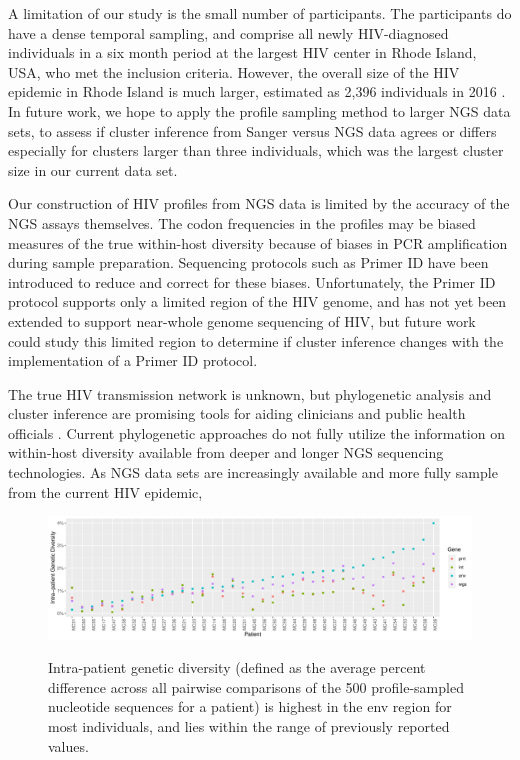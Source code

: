 \documentclass[letterpaper]{article}
\begin{document}
A limitation of our study is the small number of participants. The participants do have a dense temporal sampling, and comprise all newly HIV-diagnosed individuals in a six month period at the largest HIV center in Rhode Island, USA, who met the inclusion criteria. However, the overall size of the HIV epidemic in Rhode Island is much larger, estimated as 2,396 individuals in 2016 \parencite{ridoh}. In future work, we hope to apply the profile sampling method to larger NGS data sets, to assess if cluster inference from Sanger versus NGS data agrees or differs especially for clusters larger than three individuals, which was the largest cluster size in our current data set.

Our construction of HIV profiles from NGS data is limited by the accuracy of the NGS assays themselves. The codon frequencies in the profiles may be biased measures of the true within-host diversity because of biases in PCR amplification during sample preparation. Sequencing protocols such as Primer ID \cite{jabara} have been introduced to reduce and correct for these biases. Unfortunately, the Primer ID protocol supports only a limited region of the HIV genome, and has not yet been extended to support near-whole genome sequencing of HIV, but future work could study this limited region to determine if cluster inference changes with the implementation of a Primer ID protocol.

The true HIV transmission network is unknown, but phylogenetic analysis and cluster inference are promising tools for aiding clinicians and public health officials \cite{fauci}. Current phylogenetic approaches do not fully utilize the information on within-host diversity available from deeper and longer NGS sequencing technologies. As NGS data sets are increasingly available and more fully sample from the current HIV epidemic, 

\printbibliography

\begin{figure}[p!]
	\caption{Intra-patient genetic diversity (defined as the average percent difference across all pairwise comparisons of the 500 profile-sampled nucleotide sequences for a patient) is highest in the env region for most individuals, and lies within the range of previously reported values.}
	\centering
	\includegraphics[width=\linewidth]{Figure1}
	\label{fig1}
\end{figure}
\end{document}
